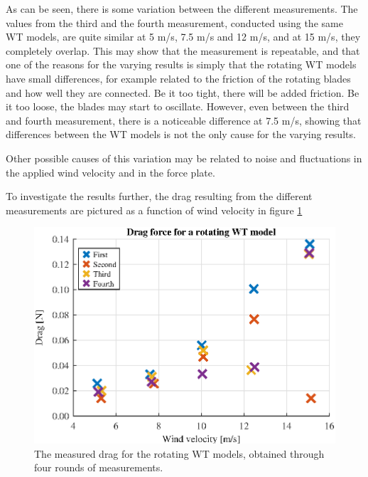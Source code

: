 As can be seen, there is some variation between the different measurements. The values from the third and the fourth measurement, conducted using the same WT models, are quite similar at 5 m/s, 7.5 m/s and 12 m/s, and at 15 m/s, they completely overlap. This may show that the measurement is repeatable, and that one of the reasons for the varying results is simply that the rotating WT models have small differences, for example related to the friction of the rotating blades and how well they are connected. Be it too tight, there will be added friction. Be it too loose, the blades may start to oscillate. However, even between the third and fourth measurement, there is a noticeable difference at 7.5 m/s, showing that differences between the WT models is not the only cause for the varying results. 

Other possible causes of this variation may be related to noise and fluctuations in the applied wind velocity and in the force plate. 

To investigate the results further, the drag resulting from the different measurements are pictured as a function of wind velocity in figure \ref{fig:RotationalDrag}


\begin{figure}[h!]
    \centering
    \includegraphics[width=\linewidth]{0_Images/RotationalDrag.eps}
    \caption{The measured drag for the rotating WT models, obtained through four rounds of measurements.}
    \label{fig:RotationalDrag}
\end{figure}

